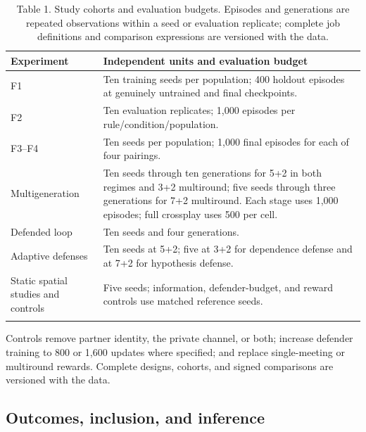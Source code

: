 \documentclass[
  12pt,
]{article}
\begin{document}
\begin{table}[htbp]
\centering
\caption{Table 1. Study cohorts and evaluation budgets. Episodes and generations
are repeated observations within a seed or evaluation replicate;
complete job definitions and comparison expressions are versioned with
the data.}\label{tab:1}
\begin{tabular}{@{}
  >{\raggedright\arraybackslash}p{}
  >{\raggedright\arraybackslash}p{}@{}}
\toprule\noalign{}
\begin{minipage}[b]{\linewidth}\raggedright
Experiment
\end{minipage} & \begin{minipage}[b]{\linewidth}\raggedright
Independent units and evaluation budget
\end{minipage} \\
\midrule\noalign{}

F1 & Ten training seeds per population; 400 holdout episodes at
genuinely untrained and final checkpoints. \\
F2 & Ten evaluation replicates; 1,000 episodes per
rule/condition/population. \\
F3--F4 & Ten seeds per population; 1,000 final episodes for each of four
pairings. \\
Multigeneration & Ten seeds through ten generations for 5+2 in both
regimes and 3+2 multiround; five seeds through three generations for 7+2
multiround. Each stage uses 1,000 episodes; full crossplay uses 500 per
cell. \\
Defended loop & Ten seeds and four generations. \\
Adaptive defenses & Ten seeds at 5+2; five at 3+2 for dependence defense
and at 7+2 for hypothesis defense. \\
Static spatial studies and controls & Five seeds; information,
defender-budget, and reward controls use matched reference seeds. \\
\bottomrule\noalign{}
\end{tabular}
\end{table}

Controls remove partner identity, the private channel, or both; increase
defender training to 800 or 1,600 updates where specified; and replace
single-meeting or multiround rewards. Complete designs, cohorts, and
signed comparisons are versioned with the data.

\FloatBarrier

\subsection{Outcomes, inclusion, and
inference}\label{outcomes-inclusion-and-inference}
\end{document}
